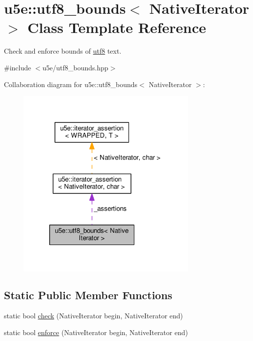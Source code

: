 \hypertarget{classu5e_1_1utf8__bounds}{}\section{u5e\+:\+:utf8\+\_\+bounds$<$ Native\+Iterator $>$ Class Template Reference}
\label{classu5e_1_1utf8__bounds}


Check and enforce bounds of \hyperlink{classu5e_1_1utf8}{utf8} text.  




{\ttfamily \#include $<$u5e/utf8\+\_\+bounds.\+hpp$>$}



Collaboration diagram for u5e\+:\+:utf8\+\_\+bounds$<$ Native\+Iterator $>$\+:
\nopagebreak
\begin{figure}[H]
\begin{center}
\leavevmode
\includegraphics[width=251pt]{classu5e_1_1utf8__bounds__coll__graph}
\end{center}
\end{figure}
\subsection*{Static Public Member Functions}
\begin{DoxyCompactItemize}
\item 
static bool \hyperlink{classu5e_1_1utf8__bounds_aa694f7da507952fd82e19ade91e1e53e}{check} (Native\+Iterator begin, Native\+Iterator end)
\item 
static bool \hyperlink{classu5e_1_1utf8__bounds_ac46365c6e7895ed86e7ac54fb29ebda4}{enforce} (Native\+Iterator begin, Native\+Iterator end)
\end{DoxyCompactItemize}
